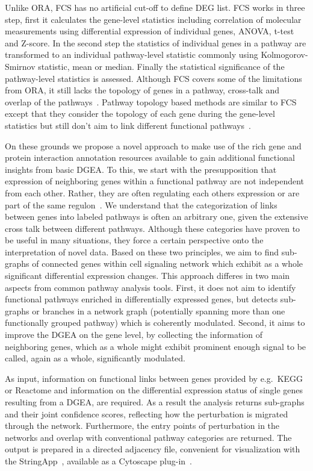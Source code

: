 \documentclass[10pt,a4paper,twocolumn]{article}
\begin{document}
Unlike ORA, FCS has no artificial cut-off to define DEG list. FCS works in
three step, first it calculates the gene-level statistics including
correlation of molecular measurements using differential expression of
individual genes, ANOVA, t-test and Z-score. In the second step the
statistics of individual genes in a pathway are transformed to an
individual pathway-level statistic commonly using Kolmogorov-Smirnov
statistic, mean or median. Finally the statistical significance of the
pathway-level statistics is assessed. Although FCS covers some of the
limitations from ORA, it still lacks the topology of genes in a pathway,
cross-talk and overlap of the pathways~\cite{Khatri2012,Campos}. Pathway
topology based methods are similar to FCS except that they consider the
topology of each gene during the gene-level statistics but still don't aim
to link different functional pathways~\cite{Khatri2012}.

On these grounds we propose a novel approach to make use of the rich gene
and protein interaction annotation resources available to gain additional
functional insights from basic DGEA. To this, we start with the
presupposition that expression of neighboring genes within a functional
pathway are not independent from each other. Rather, they are often
regulating each others expression or are part of the same
regulon~\cite{Michalak}. We understand that the categorization of links
between genes into labeled pathways is often an arbitrary one, given the
extensive cross talk between different pathways. Although these categories
have proven to be useful in many situations, they force a certain
perspective onto the interpretation of novel data. Based on these two
principles, we aim to find sub-graphs of connected genes within cell
signaling network which exhibit as a whole significant differential
expression changes. This approach differes in two main aspects from common
pathway analysis tools. First, it does not aim to identify functional
pathways enriched in differentially expressed genes, but detects sub-graphs
or branches in a network graph (potentially spanning more than one
functionally grouped pathway) which is coherently modulated. Second, it
aims to improve the DGEA on the gene level, by collecting the information
of neighboring genes, which as a whole might exhibit prominent enough
signal to be called, again as a whole, significantly modulated.

As input, information on functional links between genes provided by
e.g.~KEGG or Reactome and information on the differential expression status
of single genes resulting from a DGEA, are required. As a result the
analysis returns sub-graphs and their joint confidence scores, reflecting
how the perturbation is migrated through the network. Furthermore, the
entry points of perturbation in the networks and overlap with conventional
pathway categories are returned. The output is prepared in a directed adjacency file, convenient for
visualization with the StringApp~\cite{StringApp}, available as a Cytoscape plug-in~\cite{Cyto}.
\end{document}
